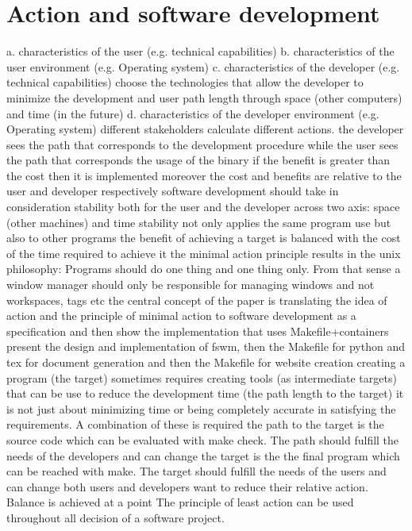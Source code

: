 \documentclass[journal]{IEEEtran}
\begin{document}
\section{Action and software development}
a. characteristics of the user (e.g. technical capabilities)
b. characteristics of the user environment (e.g. Operating system)
c. characteristics of the developer (e.g. technical capabilities)
choose the technologies that allow the developer to minimize the development and user path length through space (other computers) and time (in the future)
d. characteristics of the developer environment (e.g. Operating system)
different stakeholders calculate different actions. the developer sees the path that corresponds to the development procedure while the user sees the path that corresponds the usage of the binary
if the benefit is greater than the cost then it is implemented
moreover the cost and benefits are relative to the user and developer respectively
software development should take in consideration stability both for the user and the developer across two axis: space (other machines) and time
stability not only applies the same program use but also to other programs
the benefit of achieving a target is balanced with the cost of the time required to achieve it
the minimal action principle results in the unix philosophy: Programs should do one thing and one thing only. From that sense a window manager should only be responsible for managing windows and not workspaces, tags etc
the central concept of the paper is translating the idea of action and the principle of minimal action to software development as a specification and then show the implementation that uses Makefile+containers
present the design and implementation of fswm, then the Makefile for python and tex for document generation and then the Makefile for website creation
creating a program (the target) sometimes requires creating tools (as intermediate targets) that can be use to reduce the development time (the path length to the target)
it is not just about minimizing time or being completely accurate in satisfying the requirements. A combination of these is required
the path to the target is the source code which can be evaluated with make check. The path should fulfill the needs of the developers and can change
the target is the the final program which can be reached with make. The target should fulfill the needs of the users and can change
both users and developers want to reduce their relative action. Balance is achieved at a point
The principle of least action can be used throughout all decision of a software project.
\end{document}
